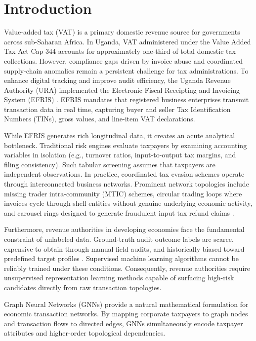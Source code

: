 \documentclass[10pt,twocolumn]{article}
\begin{document}
\section{Introduction}
\label{sec:intro}

Value-added tax (VAT) is a primary domestic revenue source for governments across sub-Saharan Africa. In Uganda, VAT administered under the Value Added Tax Act Cap 344 accounts for approximately one-third of total domestic tax collections. However, compliance gaps driven by invoice abuse and coordinated supply-chain anomalies remain a persistent challenge for tax administrations. To enhance digital tracking and improve audit efficiency, the Uganda Revenue Authority (URA) implemented the Electronic Fiscal Receipting and Invoicing System (EFRIS) \cite{ura2019efris}. EFRIS mandates that registered business enterprises transmit transaction data in real time, capturing buyer and seller Tax Identification Numbers (TINs), gross values, and line-item VAT declarations.

While EFRIS generates rich longitudinal data, it creates an acute analytical bottleneck. Traditional risk engines evaluate taxpayers by examining accounting variables in isolation (e.g., turnover ratios, input-to-output tax margins, and filing consistency). Such tabular screening assumes that taxpayers are independent observations. In practice, coordinated tax evasion schemes operate through interconnected business networks. Prominent network topologies include missing trader intra-community (MTIC) schemes, circular trading loops where invoices cycle through shell entities without genuine underlying economic activity, and carousel rings designed to generate fraudulent input tax refund claims \cite{pomer2019tax, batista2023detecting}. 

Furthermore, revenue authorities in developing economies face the fundamental constraint of unlabeled data. Ground-truth audit outcome labels are scarce, expensive to obtain through manual field audits, and historically biased toward predefined target profiles \cite{akoglu2015graph, liu2021anomaly}. Supervised machine learning algorithms cannot be reliably trained under these conditions. Consequently, revenue authorities require unsupervised representation learning methods capable of surfacing high-risk candidates directly from raw transaction topologies.

Graph Neural Networks (GNNs) \cite{scarselli2009gnn, kipf2017semi, hamilton2017inductive} provide a natural mathematical formulation for economic transaction networks. By mapping corporate taxpayers to graph nodes and transaction flows to directed edges, GNNs simultaneously encode taxpayer attributes and higher-order topological dependencies. 
\end{document}
